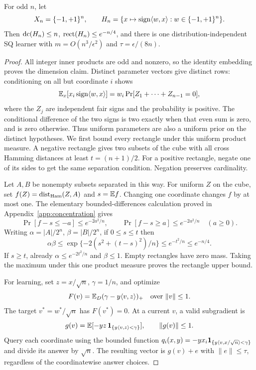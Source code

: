 \begin{theorem}\label{thm:halfspaces}
For odd $n$, let
\[
 X_n=\{-1,+1\}^n,\qquad
 H_n=\{x\mapsto\operatorname{sign}\langle w,x\rangle:w\in\{-1,+1\}^n\}.
\]
Then $\operatorname{dc}(H_n)\le n$, $\operatorname{rect}(H_n)\le e^{-n/4}$, and there is one distribution-independent SQ learner with $m=O(n^3/\epsilon^2)$ and $\tau=\epsilon/(8n)$.
\end{theorem}
\begin{proof}
All integer inner products are odd and nonzero, so the identity embedding proves the dimension claim. Distinct parameter vectors give distinct rows: conditioning on all but coordinate $i$ shows
\[
 \mathbb E_x[x_i\operatorname{sign}\langle w,x\rangle]
 =w_i\Pr[Z_1+\cdots+Z_{n-1}=0],
\]
where the $Z_j$ are independent fair signs and the probability is positive. The conditional difference of the two signs is two exactly when that even sum is zero, and is zero otherwise. Thus uniform parameters are also a uniform prior on the distinct hypotheses. We first bound every rectangle under this uniform product measure. A negative rectangle gives two subsets of the cube with all cross Hamming distances at least $t=(n+1)/2$. For a positive rectangle, negate one of its sides to get the same separation condition. Negation preserves cardinality.

Let $A,B$ be nonempty subsets separated in this way. For uniform $Z$ on the cube, set $f(Z)=\operatorname{dist}_{\rm Ham}(Z,A)$ and $s=\mathbb E f$. Changing one coordinate changes $f$ by at most one. The elementary bounded-differences calculation proved in Appendix~\ref{app:concentration} gives
\[
 \Pr[f-s\le-a]\le e^{-2a^2/n},\qquad
 \Pr[f-s\ge a]\le e^{-2a^2/n}\quad(a\ge0).
\]
Writing $\alpha=|A|/2^n$, $\beta=|B|/2^n$, if $0\le s\le t$ then
\[
 \alpha\beta\le\exp\{-2(s^2+(t-s)^2)/n\}
 \le e^{-t^2/n}\le e^{-n/4}.
\]
If $s\ge t$, already $\alpha\le e^{-2t^2/n}$ and $\beta\le1$. Empty rectangles have zero mass. Taking the maximum under this one product measure proves the rectangle upper bound.

For learning, set $z=x/\sqrt n$, $\gamma=1/n$, and optimize
\[
 F(v)=\mathbb E_D(\gamma-y\langle v,z\rangle)_+
 \quad\text{over }\|v\|\le1.
\]
The target $v^*=w^*/\sqrt n$ has $F(v^*)=0$. At a current $v$, a valid subgradient is
\[
 g(v)=\mathbb E[-yz\,\mathbf 1_{\{y\langle v,z\rangle<\gamma\}}],\qquad\|g(v)\|\le1.
\]
Query each coordinate using the bounded function
$q_i(x,y)=-yx_i\mathbf 1_{\{y\langle v,x/\sqrt n\rangle<\gamma\}}$ and divide its answer by $\sqrt n$. The resulting vector is $g(v)+e$ with $\|e\|\le\tau$, regardless of the coordinatewise answer choices.


\end{proof}
